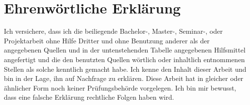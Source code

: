 \section*{Ehrenwörtliche Erklärung}

Ich versichere, dass ich die beiliegende Bachelor-, Master-, Seminar-,
oder Projektarbeit ohne Hilfe Dritter und ohne Benutzung anderer als der
angegebenen Quellen und in der untenstehenden Tabelle angegebenen
Hilfsmittel angefertigt und die den benutzten Quellen wörtlich oder
inhaltlich entnommenen Stellen als solche kenntlich gemacht habe. Ich
kenne den Inhalt dieser Arbeit und bin in der Lage, ihn auf Nachfrage zu
erklären. Diese Arbeit hat in gleicher oder ähnlicher Form noch keiner
Prüfungsbehörde vorgelegen. Ich bin mir bewusst, dass eine falsche
Erklärung rechtliche Folgen haben wird.

